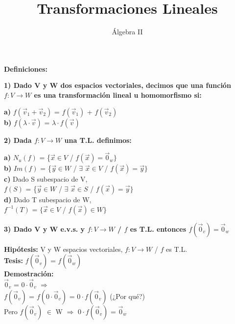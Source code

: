 \documentclass[11pt]{article}
\title{Transformaciones Lineales}
\author{Álgebra II}
\date{\vspace{-5ex}}
\begin{document}
\maketitle{}
{\Large \bfseries{Definiciones:}}

\vspace{2mm} \noindent
{\large \bfseries{1) Dado V y W dos espacios vectoriales, decimos que una función $f: V \rightarrow W$ es una transformación lineal u homomorfismo si:}}

\vspace{2mm} \noindent
{\bfseries{a)}} $f(\vec{v}_1+\vec{v}_2)$ = $f(\vec{v}_1)$ + $f(\vec{v}_2)$\\
{\bfseries{b)}} $f(\lambda \cdot \vec{v})$ = $\lambda \cdot f(\vec{v})$


\vspace{2mm} \noindent
{\large \bfseries{2) Dada $f: V \rightarrow W$ una T.L. definimos:}}

\vspace{2mm} \noindent
{\bfseries{a)}} $N_u(f)$ = \{$\vec{x} \in V$ / $f (\vec{x}) = \vec{0}_w\}$ \\
{\bfseries{b)}} $Im(f)$ = \{$\vec{y} \in W$ / $\exists$ $\vec{x} \in V$ / $f(\vec{x}) = \vec{y}\}$\\
{\bfseries{c)}} Dado S subespacio de V,\\
$f(S)$ = \{$\vec{y} \in W$ / $\exists$ $\vec{x} \in S$ / $f(\vec{x}) = \vec{y}\}$\\
{\bfseries{d)}} Dado T subespacio de W,\\
$f^{-1}(T)$ = $\{\vec{x} \in V$ / $f(\vec{x}) \in W\}$

\vspace{2mm} \noindent
{\Large \bfseries{3) Dado V y W e.v.s. y $f: V \rightarrow W$ / $f$ es T.L. entonces $f(\vec{0}_v) = \vec{0}_w$}}

\vspace{2mm} \noindent
{\bfseries Hipótesis:} V y W espacios vectoriales, $f: V \rightarrow W$ / $f$ es T.L. \\
{\bfseries Tesis:} $f(\vec{0}_v)$ = $f(\vec{0}_w)$ \\
{\bfseries Demostración:} \\
$\vec{0}_v$ = $0 \cdot \vec{0}_v$ $\Rightarrow$\\
$f(\vec{0}_v)$ = $f(0\cdot \vec{0}_v)$ = $0 \cdot f(\vec{0}_v)$ (¿Por qué?) \\
Pero $f(\vec{0}_v)$ $\in$ W $\Rightarrow$ $0 \cdot f(\vec{0}_v)$ = $\vec{0}_w$
\end{document}
